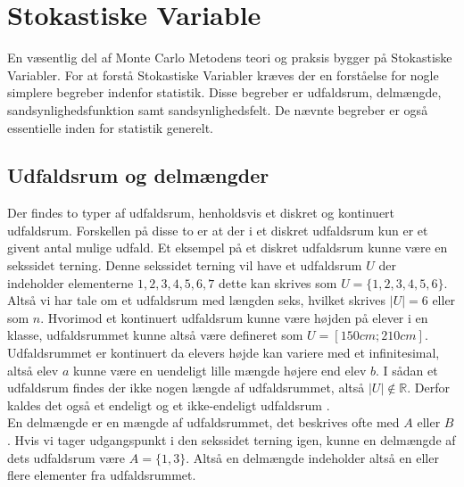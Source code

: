 \documentclass[../../SRP.tex]{subfiles}
\begin{document}
\chapter{Stokastiske Variable}

En væsentlig del af Monte Carlo Metodens teori og praksis bygger på Stokastiske Variabler. For at forstå Stokastiske Variabler kræves der en forståelse for nogle simplere begreber indenfor statistik. Disse begreber er udfaldsrum, delmængde, sandsynlighedsfunktion samt sandsynlighedsfelt. De nævnte begreber er også essentielle inden for statistik generelt.

\section{Udfaldsrum og delmængder}

Der findes to typer af udfaldsrum, henholdsvis et diskret og kontinuert udfaldsrum. Forskellen på disse to er at der i et diskret udfaldsrum kun er et givent antal mulige udfald. Et eksempel på et diskret udfaldsrum kunne være en sekssidet terning. Denne sekssidet terning vil have et udfaldsrum $U$ der indeholder elementerne $1,2,3,4,5,6,7$ dette kan skrives som $U = \{1,2,3,4,5,6\}$. Altså vi har tale om et udfaldsrum med længden seks, hvilket skrives $|U| = 6$ eller som $n$. Hvorimod et kontinuert udfaldsrum kunne være højden på elever i en klasse, udfaldsrummet kunne altså være defineret som $U = [150cm;210cm]$. Udfaldsrummet er kontinuert da elevers højde kan variere med et infinitesimal, altså elev $a$ kunne være en uendeligt lille mængde højere end elev $b$. I sådan et udfaldsrum findes der ikke nogen længde af udfaldsrummet, altså $|U| \notin \mathbb{R}$. Derfor kaldes det også et endeligt og et ikke-endeligt udfaldsrum \cite{SC}. \\

En delmængde er en mængde af udfaldsrummet, det beskrives ofte med $A$ eller $B$. Hvis vi tager udgangspunkt i den sekssidet terning igen, kunne en delmængde af dets udfaldsrum være $A = \{1,3\}$. Altså en delmængde indeholder altså en eller flere elementer fra udfaldsrummet. \\
\end{document}
